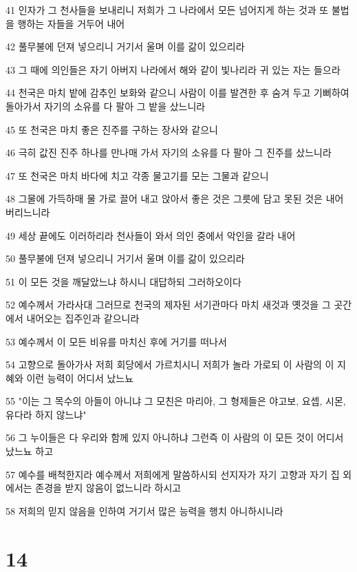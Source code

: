 \par 41 인자가 그 천사들을 보내리니 저희가 그 나라에서 모든 넘어지게 하는 것과 또 불법을 행하는 자들을 거두어 내어
\par 42 풀무불에 던져 넣으리니 거기서 울며 이를 갊이 있으리라
\par 43 그 때에 의인들은 자기 아버지 나라에서 해와 같이 빛나리라 귀 있는 자는 들으라
\par 44 천국은 마치 밭에 감추인 보화와 같으니 사람이 이를 발견한 후 숨겨 두고 기뻐하여 돌아가서 자기의 소유를 다 팔아 그 밭을 샀느니라
\par 45 또 천국은 마치 좋은 진주를 구하는 장사와 같으니
\par 46 극히 값진 진주 하나를 만나매 가서 자기의 소유를 다 팔아 그 진주를 샀느니라
\par 47 또 천국은 마치 바다에 치고 각종 물고기를 모는 그물과 같으니
\par 48 그물에 가득하매 물 가로 끌어 내고 앉아서 좋은 것은 그릇에 담고 못된 것은 내어 버리느니라
\par 49 세상 끝에도 이러하리라 천사들이 와서 의인 중에서 악인을 갈라 내어
\par 50 풀무불에 던져 넣으리니 거기서 울며 이를 갊이 있으리라
\par 51 이 모든 것을 깨달았느냐 하시니 대답하되 그러하오이다
\par 52 예수께서 가라사대 그러므로 천국의 제자된 서기관마다 마치 새것과 옛것을 그 곳간에서 내어오는 집주인과 같으니라
\par 53 예수께서 이 모든 비유를 마치신 후에 거기를 떠나서
\par 54 고향으로 돌아가사 저희 회당에서 가르치시니 저희가 놀라 가로되 이 사람의 이 지혜와 이런 능력이 어디서 났느뇨
\par 55 "이는 그 목수의 아들이 아니냐 그 모친은 마리아, 그 형제들은 야고보, 요셉, 시몬, 유다라 하지 않느냐"
\par 56 그 누이들은 다 우리와 함께 있지 아니하냐 그런즉 이 사람의 이 모든 것이 어디서 났느뇨 하고
\par 57 예수를 배척한지라 예수께서 저희에게 말씀하시되 선지자가 자기 고향과 자기 집 외에서는 존경을 받지 않음이 없느니라 하시고
\par 58 저희의 믿지 않음을 인하여 거기서 많은 능력을 행치 아니하시니라

\chapter{14}

